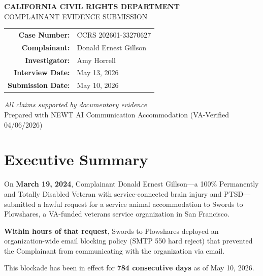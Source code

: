 \documentclass[12pt,letterpaper]{article}
\begin{document}
\begin{titlepage}
\centering
\vspace*{2cm}

{\Huge\bfseries\color{navyblue} CALIFORNIA CIVIL RIGHTS DEPARTMENT}\\[0.5cm]
{\Large COMPLAINANT EVIDENCE SUBMISSION}\\[2cm]

\begin{tabular}{rl}
\textbf{Case Number:} & CCRS 202601-33270627 \\[0.3cm]
\textbf{Complainant:} & Donald Ernest Gillson \\[0.3cm]
\textbf{Investigator:} & Amy Horrell \\[0.3cm]
\textbf{Interview Date:} & May 13, 2026 \\[0.3cm]
\textbf{Submission Date:} & May 10, 2026 \\[0.3cm]
\end{tabular}

\vfill

{\large\textit{All claims supported by documentary evidence}}\\[1cm]
{\small Prepared with NEWT AI Communication Accommodation (VA-Verified 04/06/2026)}

\end{titlepage}

\tableofcontents
\newpage

\section{Executive Summary}

On \textbf{March 19, 2024}, Complainant Donald Ernest Gillson---a 100\% Permanently and Totally Disabled Veteran with service-connected brain injury and PTSD---submitted a lawful request for a service animal accommodation to Swords to Plowshares, a VA-funded veterans service organization in San Francisco.

\textbf{Within hours of that request}, Swords to Plowshares deployed an organization-wide email blocking policy (SMTP 550 hard reject) that prevented the Complainant from communicating with the organization via email.

This blockade has been in effect for \textbf{784 consecutive days} as of May 10, 2026.
\end{document}
